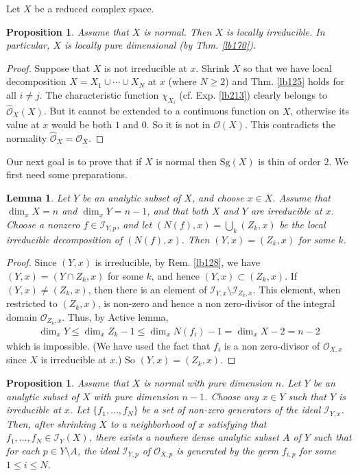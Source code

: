 \documentclass[12pt,b5paper,notitlepage]{report}
\theoremstyle{definition}
\theoremstyle{plain}
\newtheorem{pp}[df]{Proposition}
\newtheorem{lm}[df]{Lemma}
\newcommand{\scr}{\mathscr}
\newcommand{\Sg}{\mathrm{Sg}}
\newcommand{\Owht}{\widehat{\scr O}}
\numberwithin{equation}{section}
\begin{document}
Let $X$ be a reduced complex space.


\begin{pp}\label{lb245}
Assume that $X$ is normal. Then $X$ is locally irreducible. In particular, $X$ is locally pure dimensional (by Thm. \ref{lb170}).
\end{pp}


\begin{proof}
Suppose that $X$ is not irreducible at $x$. Shrink $X$ so that we have local decomposition $X=X_1\cup\cdots\cup X_N$ at $x$ (where $N\geq 2$) and Thm. \ref{lb125} holds for all $i\neq j$. The characteristic function $\chi_{X_i}$ (cf. Exp. \ref{lb213}) clearly belongs to $\Owht_X(X)$. But it cannot be extended to a continuous function on $X$, otherwise its value at $x$ would be both $1$ and $0$. So it is not in $\scr O(X)$. This contradicts the normality $\Owht_X=\scr O_X$.
\end{proof}

Our next goal is to prove that if $X$ is normal then $\Sg(X)$ is thin of order $2$. We first need some preparations.

\begin{lm}\label{lb361}
Let $Y$ be an analytic subset of $X$, and choose $x\in X$. Assume that $\dim_xX=n$ and $\dim_x Y=n-1$, and that both $X$ and $Y$ are irreducible at $x$. Choose a nonzero $f\in\scr I_{Y,p}$, and let $(N(f),x)=\bigcup_k (Z_k,x)$ be the local irreducible decomposition  of $(N(f),x)$. Then $(Y,x)=(Z_k,x)$ for some $k$.
\end{lm}


\begin{proof}
Since $(Y,x)$ is irreducible, by Rem. \ref{lb128}, we have $(Y,x)=(Y\cap Z_k,x)$ for some $k$, and hence $(Y,x)\subset (Z_k,x)$. If $(Y,x)\neq (Z_k,x)$, then there is an element of $\scr I_{Y,x}\setminus\scr I_{Z_k,x}$. This element, when restricted to $(Z_k,x)$, is non-zero and hence a non zero-divisor of the integral domain $\scr O_{Z_k,x}$. Thus, by Active lemma,
\begin{align*}
\dim_x Y\leq\dim_x Z_k-1\leq \dim_x N(f_i)-1=\dim_x X-2=n-2
\end{align*} 
which is impossible. (We have used the fact that $f_i$ is a non zero-divisor of $\scr O_{X,x}$ since $X$ is irreducible at $x$.) So $(Y,x)=(Z_k,x)$.
\end{proof}


\begin{pp}\label{lb363}
Assume that $X$ is normal with pure dimension $n$. Let $Y$ be an analytic subset of $X$ with pure dimension $n-1$. Choose any $x\in 
Y$ such that $Y$ is irreducible at $x$. Let $\{f_1,\dots,f_N\}$ be a set of non-zero generators of the ideal $\scr I_{Y,x}$. Then, after shrinking $X$ to a neighborhood of $x$ satisfying that $f_1,\dots,f_N\in\scr I_Y(X)$, there exists a nowhere dense analytic subset $A$ of $Y$ such that for each $p\in Y\setminus A$, the ideal $\scr I_{Y,p}$  of $\scr O_{X,p}$ is generated by the germ $f_{i,p}$ for some $1\leq i\leq N$.
\end{pp}
\end{document}
